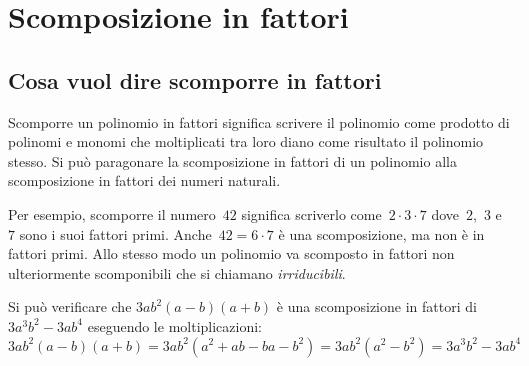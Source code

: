 
\section{Scomposizione in fattori}

\subsection{Cosa vuol dire scomporre in fattori}
\label{subsec:divpol_scomporre}

Scomporre un polinomio in fattori significa scrivere il polinomio come 
prodotto di polinomi e monomi che
moltiplicati tra loro diano come risultato il polinomio stesso. 
Si può paragonare la scomposizione in fattori
di un polinomio alla scomposizione in fattori dei numeri naturali.

\begin{minipage}{.4\textwidth}
\begin{inaccessibleblock}
 \begin{center}
 
 \end{center}
\end{inaccessibleblock}
\end{minipage}
\begin{minipage}{.6\textwidth}
\begin{inaccessibleblock}
 \begin{center}
 
 \end{center}
\end{inaccessibleblock}
\end{minipage}

Per esempio, scomporre il numero~\(42\) significa scriverlo 
come~\(2\cdot 3 \cdot 7\) dove~\(2\),~\(3\) e~\(7\) sono i suoi fattori primi.
Anche~\(42 = 6 \cdot 7\) è una scomposizione, ma non è in fattori primi. 
Allo stesso modo un polinomio va scomposto in fattori non ulteriormente
scomponibili che si chiamano \emph{irriducibili}. 

Si può verificare che \(3ab^{2}(a-b)(a+b)\) è una scomposizione in fattori di
\(3a^{3}b^{2}-3ab^{4}\) eseguendo le moltiplicazioni:
\[3ab^{2}(a-b)(a+b)=3ab^{2}(a^{2}+ab-ba-b^{2})=
  3ab^{2}\left(a^{2}-b^{2}\right)=3a^{3}b^{2}-3ab^{4}\]
  
